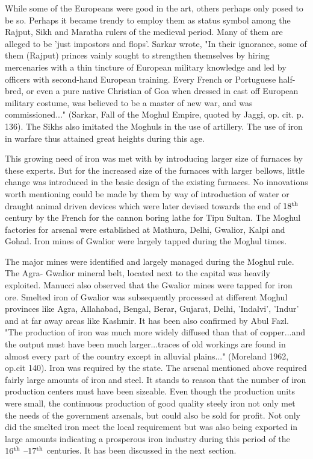 While some of the Europeans were good in the art, others perhaps only posed to be so.  Perhaps it became trendy to employ them as status symbol among the Rajput, Sikh and Maratha rulers of the medieval period. Many of them are alleged to be 'just impostors and flops'. Sarkar wrote, "In their ignorance, some of them (Rajput) princes vainly sought to strengthen themselves by hiring mercenaries with a thin tincture of European military knowledge and led by officers with second-hand European training. Every French or Portuguese half-bred, or even a pure native Christian of Goa when dressed in cast off European military costume, was believed to be a master of new war, and was commissioned..." (Sarkar, Fall of the Moghul Empire, quoted by Jaggi, op. cit. p. 136). The Sikhs also imitated the Moghuls in the use of artillery. The use of iron in warfare thus attained great heights during this age.

This growing need of iron was met with by introducing larger size of furnaces by these experts. But for the increased size of the furnaces with larger bellows, little change was introduced in the basic design of the existing furnaces. No innovations worth mentioning could be made by them by way of introduction of water or draught animal driven devices which were later devised towards the end of $18^{\rm th}$ century by the French for the cannon boring lathe for Tipu Sultan. The Moghul factories for arsenal were established at Mathura, Delhi, Gwalior, Kalpi and Gohad. Iron mines of Gwalior were largely tapped during the Moghul times. 

The major mines were identified and largely managed during the Moghul rule. The Agra- Gwalior mineral belt, located next to the capital was heavily exploited. Manucci also observed that the Gwalior mines were tapped for iron ore. Smelted iron of Gwalior was subsequently processed at different Moghul provinces like Agra, Allahabad, Bengal, Berar, Gujarat, Delhi, 'Indalvi', 'Indur' and at far away areas like Kashmir. It has been also confirmed by Abul Fazl. "The production of iron was much more widely diffused than that of copper...and the output must have been much larger...traces of old workings are found in almost every part of the country except in alluvial plains..." (Moreland 1962, op.cit  140). Iron was required by the state. The arsenal mentioned above required fairly large amounts of iron and steel. It stands to reason that the number of iron production centers must have been sizeable. Even though the production units were small, the continuous production of good quality steely iron not only met the needs of the government arsenals, but could also be sold for profit. Not only did the smelted iron meet the local requirement but was also being exported in large amounts indicating a prosperous iron industry during this period of the $16^{\rm th}$ –$17^{\rm th}$ centuries.   It has been discussed in the next section. 


